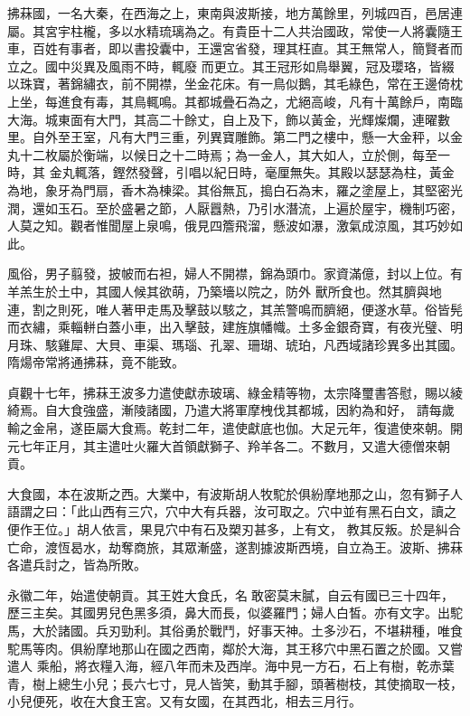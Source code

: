 \begin{pinyinscope}
 拂菻國，一名大秦，在西海之上，東南與波斯接，地方萬餘里，列城四百，邑居連屬。其宮宇柱櫳，多以水精琉璃為之。有貴臣十二人共治國政，常使一人將囊隨王車，百姓有事者，即以書投囊中，王還宮省發，理其枉直。其王無常人，簡賢者而立之。國中災異及風雨不時，輒廢
 而更立。其王冠形如鳥舉翼，冠及瓔珞，皆綴以珠寶，著錦繡衣，前不開襟，坐金花床。有一鳥似鵝，其毛綠色，常在王邊倚枕上坐，每進食有毒，其鳥輒鳴。其都城疊石為之，尤絕高峻，凡有十萬餘戶，南臨大海。城東面有大門，其高二十餘丈，自上及下，飾以黃金，光輝燦爛，連曜數里。自外至王室，凡有大門三重，列異寶雕飾。第二門之樓中，懸一大金秤，以金丸十二枚屬於衡端，以候日之十二時焉；為一金人，其大如人，立於側，每至一時，其
 金丸輒落，鏗然發聲，引唱以紀日時，毫厘無失。其殿以瑟瑟為柱，黃金為地，象牙為門扇，香木為棟梁。其俗無瓦，搗白石為末，羅之塗屋上，其堅密光潤，還如玉石。至於盛暑之節，人厭囂熱，乃引水潛流，上遍於屋宇，機制巧密，人莫之知。觀者惟聞屋上泉鳴，俄見四簷飛溜，懸波如瀑，激氣成涼風，其巧妙如此。



 風俗，男子翦發，披帔而右袒，婦人不開襟，錦為頭巾。家資滿億，封以上位。有羊羔生於土中，其國人候其欲萌，乃築墻以院之，防外
 獸所食也。然其臍與地連，割之則死，唯人著甲走馬及擊鼓以駭之，其羔警鳴而臍絕，便遂水草。俗皆髡而衣繡，乘輜軿白蓋小車，出入擊鼓，建旌旗幡幟。土多金銀奇寶，有夜光璧、明月珠、駭雞犀、大貝、車渠、瑪瑙、孔翠、珊瑚、琥珀，凡西域諸珍異多出其國。隋煬帝常將通拂菻，竟不能致。



 貞觀十七年，拂菻王波多力遣使獻赤玻璃、綠金精等物，太宗降璽書答慰，賜以綾綺焉。自大食強盛，漸陵諸國，乃遣大將軍摩栧伐其都城，因約為和好，
 請每歲輸之金帛，遂臣屬大食焉。乾封二年，遣使獻底也伽。大足元年，復遣使來朝。開元七年正月，其主遣吐火羅大首領獻獅子、羚羊各二。不數月，又遣大德僧來朝貢。



 大食國，本在波斯之西。大業中，有波斯胡人牧駝於俱紛摩地那之山，忽有獅子人語謂之曰：「此山西有三穴，穴中大有兵器，汝可取之。穴中並有黑石白文，讀之便作王位。」胡人依言，果見穴中有石及槊刃甚多，上有文，
 教其反叛。於是糾合亡命，渡恆曷水，劫奪商旅，其眾漸盛，遂割據波斯西境，自立為王。波斯、拂菻各遣兵討之，皆為所敗。



 永徽二年，始遣使朝貢。其王姓大食氏，名敢密莫末膩，自云有國已三十四年，歷三主矣。其國男兒色黑多須，鼻大而長，似婆羅門；婦人白皙。亦有文字。出駝馬，大於諸國。兵刃勁利。其俗勇於戰鬥，好事天神。土多沙石，不堪耕種，唯食駝馬等肉。俱紛摩地那山在國之西南，鄰於大海，其王移穴中黑石置之於國。又嘗遣人
 乘船，將衣糧入海，經八年而未及西岸。海中見一方石，石上有樹，乾赤葉青，樹上總生小兒；長六七寸，見人皆笑，動其手腳，頭著樹枝，其使摘取一枝，小兒便死，收在大食王宮。又有女國，在其西北，相去三月行。




\end{pinyinscope}
